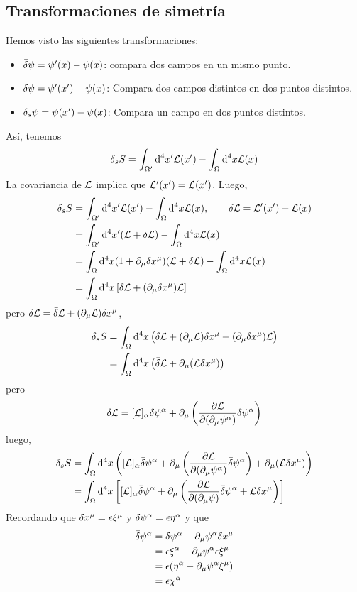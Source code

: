 \subsection{Transformaciones de simetría}
Hemos visto las siguientes transformaciones:
\begin{itemize}
	\item $\bar{\delta}\psi=\psi'(x)-\psi(x)$: compara dos campos en un mismo punto.
	\item $\delta\psi=\psi'(x')-\psi(x)$: Compara dos campos distintos en dos puntos distintos.
	\item $\delta_s\psi=\psi(x')-\psi(x)$: Compara un campo en dos puntos distintos.
\end{itemize}
Así, tenemos
\begin{align}
  \delta_sS=\int_{\Omega'}\dd^4x'\mathcal{L}(x')-\int_\Omega \dd^4x\mathcal{L}(x)
\end{align}
La covariancia de $\mathcal{L}$ implica que $\mathcal{L}'(x')=\mathcal{L}(x')$. Luego,
\begin{align}
  \delta_sS&=\int_{\Omega'}\dd^4x'\mathcal{L}(x')-\int_\Omega \dd^4x\mathcal{L}(x),\qquad \delta\mathcal{L}=\mathcal{L}'(x')-\mathcal{L}(x)\\
  &=\int_{\Omega'}\dd^4x'(\mathcal{L} +\delta\mathcal{L} )-\int_\Omega \dd^4x\mathcal{L}(x)\\
  &=\int_\Omega\dd^4x(1+\partial_\mu\delta x^\mu )(\mathcal{L}+\delta\mathcal{L} )-\int_\Omega \dd^4x\mathcal{L}(x)\\
  &=\int_\Omega\dd^4x\left[\delta\mathcal{L} +(\partial_\mu\delta x^\mu )\mathcal{L} \right]
\end{align}
pero $\delta\mathcal{L} =\bar{\delta}\mathcal{L} +(\partial_\mu\mathcal{L} )\delta x^\mu $,
\begin{align}
  \delta_sS&=\int_\Omega\dd^4x\left(\bar{\delta}\mathcal{L} +(\partial_\mu\mathcal{L} )\delta x^\mu +(\partial_\mu \delta x^\mu )\mathcal{L} \right)\\
  &=\int_\Omega\dd^4x\left(\bar{\delta}\mathcal{L} +\partial_\mu(\mathcal{L} \delta x^\mu )\right)
\end{align}
pero
\begin{equation}
  \bar{\delta}\mathcal{L} =[\mathcal{L} ]_\alpha \bar{\delta}\psi^\alpha +\partial_\mu \left(\pdv{\mathcal{L}}{(\partial_\mu\psi^\alpha)}\bar{\delta}\psi^\alpha \right)
\end{equation}
luego,
\begin{align}
  \delta_sS&=\int_\Omega\dd^4x\left([\mathcal{L} ]_\alpha \bar{\delta}\psi^\alpha +\partial_\mu \left(\pdv{\mathcal{L}}{(\partial_\mu\psi^\alpha)}\bar{\delta}\psi^\alpha \right) +\partial_\mu(\mathcal{L} \delta x^\mu )\right)\\
  &=\int_\Omega\dd^4x\left[[\mathcal{L} ]_\alpha \bar{\delta}\psi^\alpha +\partial_\mu \left(\pdv{\mathcal{L}}{(\partial_\mu\psi)}\bar{\delta}\psi^\alpha +\mathcal{L}\delta x^\mu \right)\right]
\end{align}
Recordando que $\delta x^\mu =\epsilon\xi^\mu $ y $\delta\psi^\alpha =\epsilon\eta^\alpha $ y que
\begin{align}
  \bar{\delta}\psi^\alpha &=\delta\psi^\alpha -\partial_\mu \psi^\alpha \delta x^\mu \\
  &=\epsilon\xi^\alpha -\partial_\mu \psi^\alpha \epsilon\xi^\mu \\
  &=\epsilon(\eta^\alpha -\partial_\mu \psi^\alpha \xi^\mu )\\
  &=\epsilon\chi ^\alpha 
\end{align}

